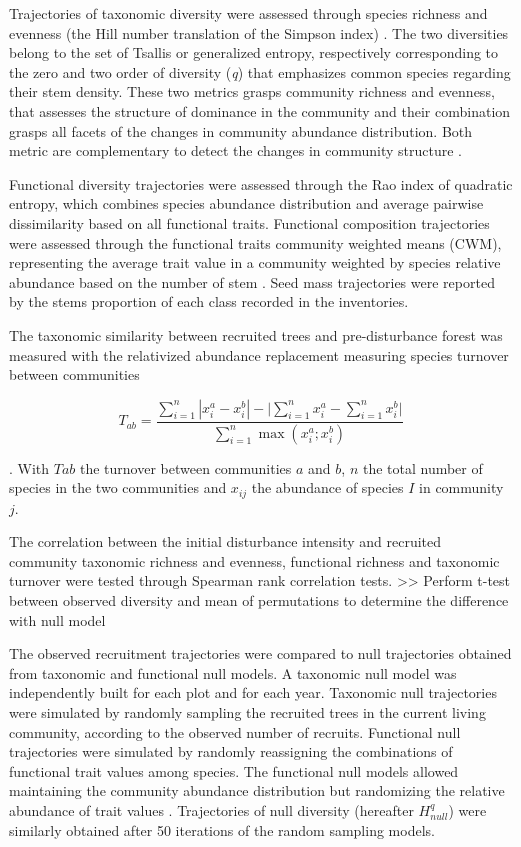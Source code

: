 \documentclass[fleqn,10pt]{ArtEcoFoG} %
\begin{document}
Trajectories of taxonomic diversity were assessed through species
richness and evenness (the Hill number translation of the Simpson index)
\citep{Chao2015, Marcon2015}. The two diversities belong to the set of
Tsallis or generalized entropy, respectively corresponding to the zero
and two order of diversity (\emph{q}) that emphasizes common species
regarding their stem density. These two metrics grasps community
richness and evenness, that assesses the structure of dominance in the
community and their combination grasps all facets of the changes in
community abundance distribution. Both metric are complementary to
detect the changes in community structure \citep{Magurran2004}.

Functional diversity trajectories were assessed through the Rao index of
quadratic entropy, which combines species abundance distribution and
average pairwise dissimilarity based on all functional traits.
Functional composition trajectories were assessed through the functional
traits community weighted means (CWM), representing the average trait
value in a community weighted by species relative abundance based on the
number of stem \citep{Diaz2007}. Seed mass trajectories were reported by
the stems proportion of each class recorded in the inventories.

The taxonomic similarity between recruited trees and pre-disturbance
forest was measured with the relativized abundance replacement measuring
species turnover between communities \citep{Podani2013a}

\begin{equation}
T_{ab}=\frac{\sum_{i=1}^{n}|x_i^a - x_i^b| - \bigg| \sum_{i=1}^{n}{x_i^a} - \sum_{i=1}^{n}{x_i^b} \bigg|}{\sum_{i=1}^{n}\max{\left( x_i^a;x_i^b \right)}}
\label{eq:formNestedness}
\end{equation}

. With \(Tab\) the turnover between communities \(a\) and \(b\), \(n\)
the total number of species in the two communities and \(x_{ij}\) the
abundance of species \(I\) in community \(j\).

The correlation between the initial disturbance intensity and recruited
community taxonomic richness and evenness, functional richness and
taxonomic turnover were tested through Spearman rank correlation tests.
\textgreater{}\textgreater{} Perform t-test between observed diversity
and mean of permutations to determine the difference with null model

The observed recruitment trajectories were compared to null trajectories
obtained from taxonomic and functional null models. A taxonomic null
model was independently built for each plot and for each year. Taxonomic
null trajectories were simulated by randomly sampling the recruited
trees in the current living community, according to the observed number
of recruits. Functional null trajectories were simulated by randomly
reassigning the combinations of functional trait values among species.
The functional null models allowed maintaining the community abundance
distribution but randomizing the relative abundance of trait values
\citep{Mason2013}. Trajectories of null diversity (hereafter
\(H^q_{null}\)) were similarly obtained after 50 iterations of the
random sampling models.
\end{document}
